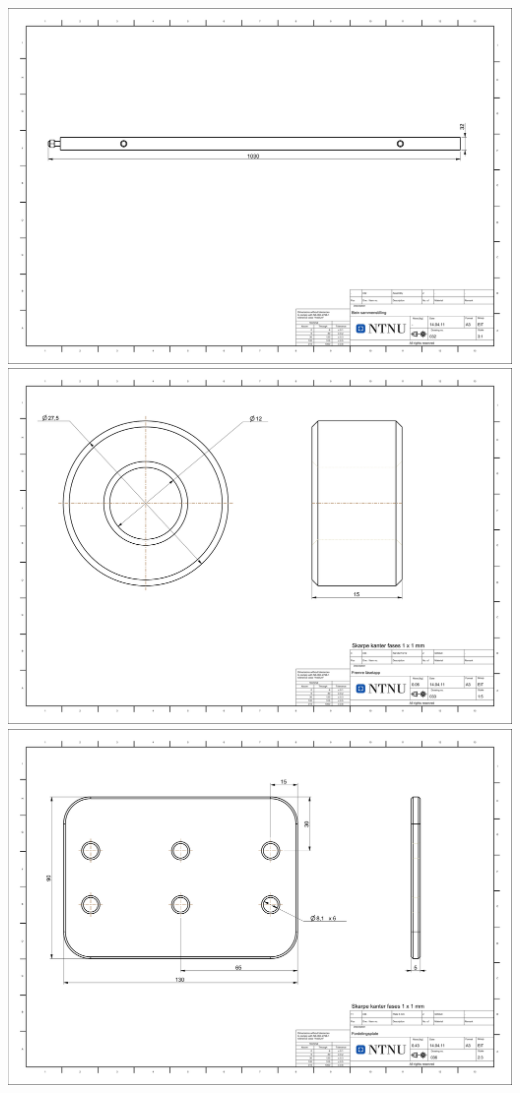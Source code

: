 \includegraphics[angle=90, width=\textwidth]{arbeidstegninger/032}\newpage
\includegraphics[angle=90, width=\textwidth]{arbeidstegninger/033}\newpage
\includegraphics[angle=90, width=\textwidth]{arbeidstegninger/036}\newpage
